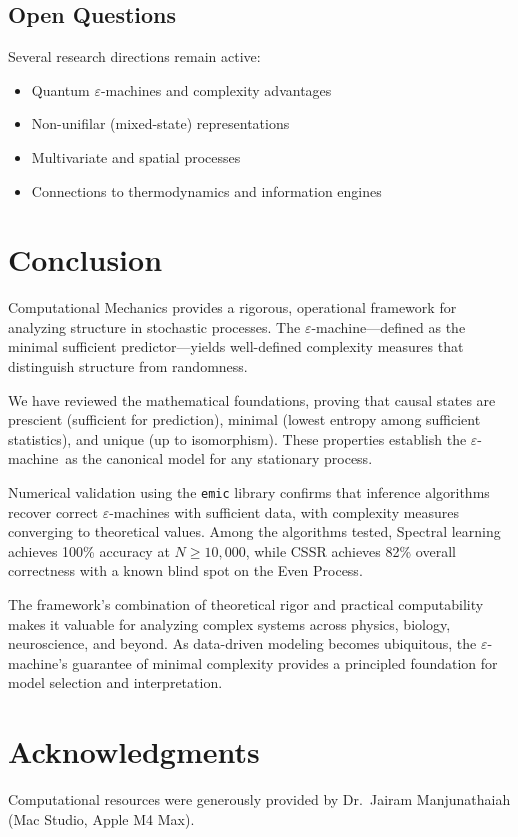 \documentclass[11pt,twocolumn]{article}
\theoremstyle{plain}
\theoremstyle{definition}
\theoremstyle{remark}
\newcommand{\eps}{\varepsilon}
\newcommand{\eM}{$\eps$-machine}
\begin{document}
\subsection{Open Questions}

Several research directions remain active:
\begin{itemize}[nosep]
    \item Quantum \eM s and complexity advantages \cite{gu2012quantum}
    \item Non-unifilar (mixed-state) representations
    \item Multivariate and spatial processes
    \item Connections to thermodynamics and information engines
\end{itemize}

\section{Conclusion}
\label{sec:conclusion}

Computational Mechanics provides a rigorous, operational framework for analyzing structure in stochastic processes. The \eM---defined as the minimal sufficient predictor---yields well-defined complexity measures that distinguish structure from randomness.

We have reviewed the mathematical foundations, proving that causal states are prescient (sufficient for prediction), minimal (lowest entropy among sufficient statistics), and unique (up to isomorphism). These properties establish the \eM\ as the canonical model for any stationary process.

Numerical validation using the \texttt{emic} library confirms that inference algorithms recover correct \eM s with sufficient data, with complexity measures converging to theoretical values. Among the algorithms tested, Spectral learning achieves 100\% accuracy at $N \geq 10{,}000$, while CSSR achieves 82\% overall correctness with a known blind spot on the Even Process.

The framework's combination of theoretical rigor and practical computability makes it valuable for analyzing complex systems across physics, biology, neuroscience, and beyond. As data-driven modeling becomes ubiquitous, the \eM's guarantee of minimal complexity provides a principled foundation for model selection and interpretation.

\section*{Acknowledgments}

Computational resources were generously provided by Dr.\ Jairam Manjunathaiah (Mac Studio, Apple M4 Max).



\end{document}
